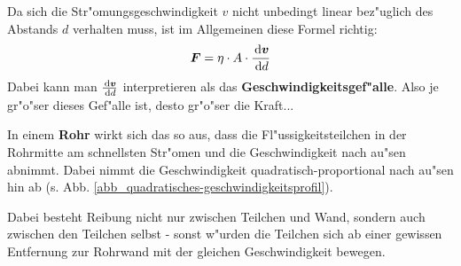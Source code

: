 Da sich die Str"omungsgeschwindigkeit $v$ nicht unbedingt linear
bez"uglich des Abstands $d$ verhalten muss, ist im Allgemeinen diese
Formel richtig:
\begin{equation}
   \label{eq:74}
   \boldsymbol{F} = \eta \cdot A \cdot \frac{\, \mathrm{d} \boldsymbol{v}}{\, \mathrm{d} d}
\end{equation}
Dabei kann man $\frac{\, \mathrm{d} \boldsymbol{v}}{\, \mathrm{d} d}$ interpretieren als das
\textbf{Geschwindigkeitsgef"alle}. Also je gr"o"ser dieses Gef"alle ist,
desto gr"o"ser die Kraft...

\bigskip

In einem \textbf{Rohr} wirkt sich das so aus, dass die
Fl"ussigkeitsteilchen in der Rohrmitte am schnellsten Str"omen und die
Geschwindigkeit nach au"sen abnimmt. Dabei nimmt die Geschwindigkeit
quadratisch-proportional nach au"sen hin ab
(s. Abb. \ref{abb_quadratisches-geschwindigkeitsprofil}).

Dabei besteht Reibung nicht nur zwischen Teilchen und Wand, sondern auch
zwischen den Teilchen selbst - sonst w"urden die Teilchen sich ab einer
gewissen Entfernung zur Rohrwand mit der gleichen Geschwindigkeit
bewegen.




